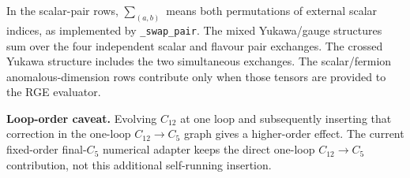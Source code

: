 \documentclass[9pt]{article}
\begin{document}
\noindent In the scalar-pair rows, $\sum_{(a,b)}$ means both permutations of
external scalar indices, as implemented by \texttt{\_swap\_pair}. The mixed
Yukawa/gauge structures sum over the four independent scalar and flavour
pair exchanges. The crossed Yukawa structure includes the two simultaneous
exchanges. The scalar/fermion anomalous-dimension rows contribute only when
those tensors are provided to the RGE evaluator.

\textbf{Loop-order caveat.} Evolving $C_{12}$ at one loop and subsequently
inserting that correction in the one-loop $C_{12}\to C_5$ graph gives a
higher-order effect. The current fixed-order final-$C_5$ numerical adapter
keeps the direct one-loop $C_{12}\to C_5$ contribution, not this additional
self-running insertion.
\end{document}
